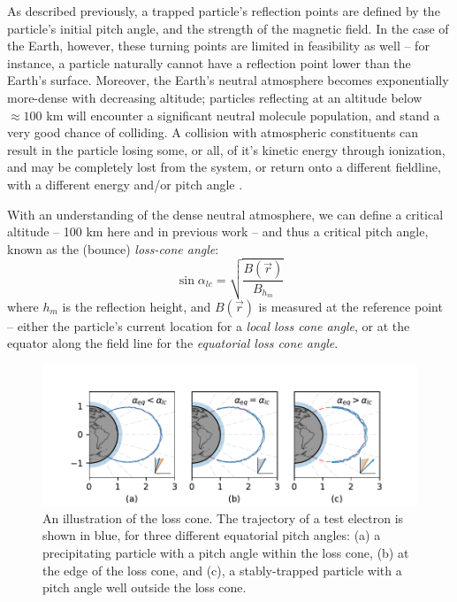 As described previously, a trapped particle's reflection points are defined by the particle's initial pitch angle, and the strength of the magnetic field. In the case of the Earth, however, these turning points are limited in feasibility as well -- for instance, a particle naturally cannot have a reflection point lower than the Earth's surface. Moreover, the Earth's neutral atmosphere becomes exponentially more-dense with decreasing altitude; particles reflecting at an altitude below $\approx 100$ km will encounter a significant neutral molecule population, and stand a very good chance of colliding. A collision with atmospheric constituents can result in the particle losing some, or all, of it's kinetic energy through ionization, and may be completely lost from the system, or return onto a different fieldline, with a different energy and/or pitch angle \citep{Cotts2011}.

With an understanding of the dense neutral atmosphere, we can define a critical altitude -- 100 km here and in previous work -- and thus a critical pitch angle, known as the (bounce) \emph{loss-cone angle}:
\begin{equation}
\sin \alpha_{lc} = \sqrt{\frac{B(\vec{r})}{B_{h_m}}}
\end{equation}
where $h_m$ is the reflection height, and $B(\vec{r})$ is measured at the reference point -- either the particle's current location for a \emph{local loss cone angle}, or at the equator along the field line for the \emph{equatorial loss cone angle}.

\begin{figure}[h]
\begin{center}
\includegraphics[width=\textwidth]{figures/pitchangle_trapping_3up.pdf}
\caption[Loss cone illustration]{An illustration of the loss cone. The trajectory of a test electron is shown in blue, for three different equatorial pitch angles: (a) a precipitating particle with a pitch angle within the loss cone,  (b) at the edge of the loss cone, and (c), a stably-trapped particle with a pitch angle well outside the loss cone.}
\label{fig:loss_cone_examples}
\end{center}
\end{figure}


